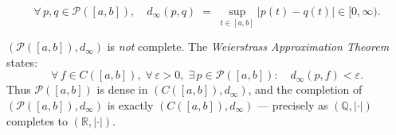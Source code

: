\begin{remark*}
\[
\forall\, p, q \in \mathcal{P}([a,b]), \quad
d_\infty(p,q) \;=\; \sup_{t \in [a,b]}|p(t) - q(t)| \in [0,\infty).
\]
\end{remark*}

\begin{remark*}
$(\mathcal{P}([a,b]), d_\infty)$ is \emph{not} complete.
The \emph{Weierstrass Approximation Theorem} states:
\[
\forall\, f \in C([a,b]),\;
\forall\,\varepsilon > 0,\;
\exists\, p \in \mathcal{P}([a,b]):\quad
d_\infty(p,f) < \varepsilon.
\]
Thus $\mathcal{P}([a,b])$ is dense in $(C([a,b]), d_\infty)$, and
the completion of $(\mathcal{P}([a,b]), d_\infty)$ is exactly
$(C([a,b]), d_\infty)$ --- precisely as $(\mathbb{Q},|\cdot|)$ completes
to $(\mathbb{R},|\cdot|)$.
\end{remark*}